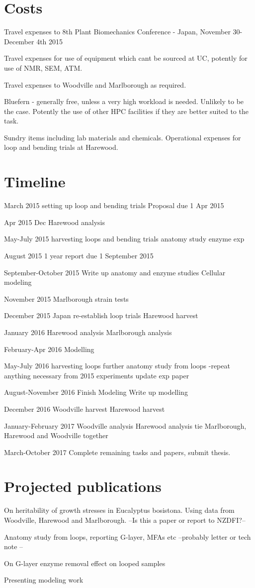 \documentclass{article}
\begin{document}
\section{Costs}
Travel expenses to 8th Plant Biomechanics Conference - Japan, November
30-December 4th 2015

Travel expenses for use of equipment which cant be sourced at UC,
potently for use of NMR, SEM, ATM.

Travel expenses to Woodville and Marlborough as required.

Bluefern - generally free, unless a very high workload is needed. Unlikely to be
the case. Potently the use of other HPC facilities if they are better suited to
the task.

Sundry items including lab materials and chemicals. Operational
expenses for loop and bending trials at Harewood.

\section{Timeline}

March 2015
setting up loop and bending trials
Proposal due 1 Apr 2015

Apr 2015
Dec Harewood analysis

May-July 2015
harvesting loops and bending trials
anatomy study
enzyme exp

August 2015
1 year report due 1 September 2015

September-October 2015
Write up anatomy and enzyme studies
Cellular modeling

November 2015
Marlborough strain tests

December 2015
Japan
re-establish loop trials
Harewood harvest

January 2016
Harewood analysis
Marlborough analysis

February-Apr 2016
Modelling

May-July 2016
harvesting loops
further anatomy study from loops -repeat anything necessary from 2015
experiments
update exp paper

August-November 2016
Finish Modeling
Write up modelling

December 2016
Woodville harvest
Harewood harvest

January-February 2017
Woodville analysis
Harewood analysis
tie Marlborough, Harewood and Woodville together

March-October 2017
Complete remaining tasks and papers, submit thesis.

\section{Projected publications}
On heritability of growth stresses in Eucalyptus bosistona. Using data from
Woodville, Harewood and Marlborough. --Is this a paper or report to NZDFI?--

Anatomy study from loops, reporting G-layer, MFAs etc --probably letter or tech
note --

On G-layer enzyme removal effect on looped samples

Presenting modeling work
\end{document}

